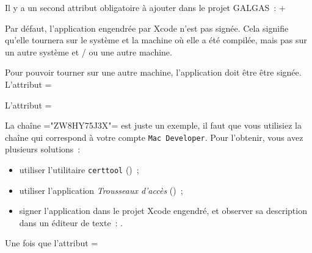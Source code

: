 
Il y a un second attribut obligatoire à ajouter dans le projet GALGAS~: \ggs+%



Par défaut, l'application engendrée par Xcode n'est pas signée. Cela signifie qu'elle tournera sur le système et la machine où elle a été compilée, mais pas sur un autre système et / ou une autre machine.

Pour pouvoir tourner sur une autre machine, l'application doit être être signée. L'attribut \ggs=%


L'attribut \ggs=%
\begin{galgas}
\end{galgas}

La chaîne \ggs="ZW8HY75J3X"= est juste un exemple, il faut que vous utilisiez la chaîne qui correspond à votre compte \texttt{Mac Developer}. Pour l'obtenir, vous avez plusieurs solutions~:
\begin{itemize}
  \item utiliser l'utilitaire \texttt{certtool} ()~;
  \item utiliser l'application \emph{Trousseaux d'accès} ()~;
  \item signer l'application dans le projet Xcode engendré, et observer sa description dans un éditeur de texte~: .
\end{itemize}

Une fois que l'attribut \ggs=%

